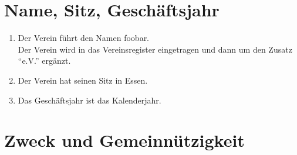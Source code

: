 \documentclass[10pt,a4paper]{scrartcl}
\begin{document}
\clearpage
\section{Name, Sitz, Geschäftsjahr}

\begin{enumerate}[label=(\arabic*)]
\item
  Der Verein führt den Namen foobar.\\
  Der Verein wird in das Vereinsregister eingetragen und dann um den Zusatz "`e.V."' ergänzt.
\item
  Der Verein hat seinen Sitz in Essen.
\item
  Das Geschäftsjahr ist das Kalenderjahr.
\end{enumerate}


\section{Zweck und Gemeinnützigkeit}
\end{document}

